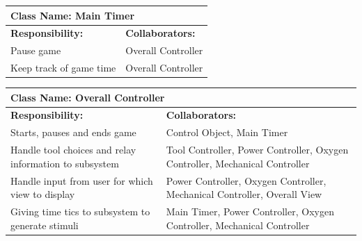 \documentclass[12pt, titlepage]{article}
\begin{document}
\begin{enumerate}[a)]
	\begin{table}[H]
		\centering
		\begin{tabular}{|p{5cm}|p{5cm}|}
		\hline 
		 \multicolumn{2}{|l|}{\textbf{Class Name: Main Timer}} \\
		\hline
		\textbf{Responsibility:} & \textbf{Collaborators:} \\
		\hline
		 Pause game & Overall Controller \\
		\hline
		 Keep track of game time & Overall Controller\\
		\hline
		\end{tabular}
	\end{table}

	\begin{table}[H]
		\centering
		\begin{tabular}{|p{5cm}|p{5cm}|}
		\hline 
		 \multicolumn{2}{|l|}{\textbf{Class Name: Overall Controller}} \\
		\hline
		\textbf{Responsibility:} & \textbf{Collaborators:} \\
		\hline
		 Starts, pauses and ends game & Control Object, Main Timer \\
		\hline
		 Handle tool choices and relay information to subsystem & Tool Controller, Power Controller, Oxygen Controller, Mechanical Controller\\
		\hline
		 Handle input from user for which view to display & Power Controller, Oxygen Controller, Mechanical Controller, Overall View \\
		\hline
		 Giving time tics to subsystem to generate stimuli & Main Timer, Power Controller, Oxygen Controller, Mechanical Controller \\
		\hline
		\end{tabular}
	\end{table}

\end{enumerate}

\appendix
\end{document}
